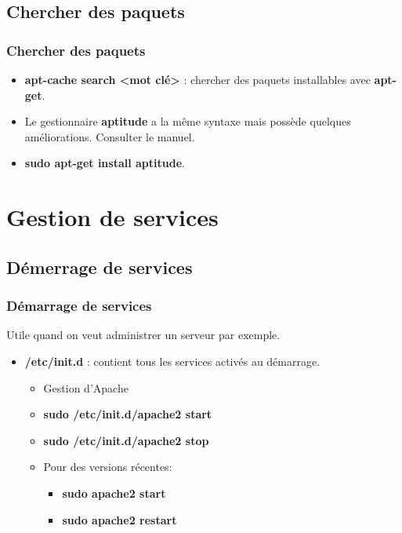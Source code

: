 \documentclass{beamer}
\begin{document}
    \subsection{Chercher des paquets}
    \begin{frame}
        \frametitle{Chercher des paquets}
        \begin{itemize}
            \item {\bf apt-cache search <mot clé>} : chercher des paquets installables avec {\bf apt-get}.
            \item Le gestionnaire {\bf aptitude} a la même syntaxe mais possède quelques améliorations. Consulter le manuel.
            \item {\bf sudo apt-get install aptitude}.
        \end{itemize}
    \end{frame}
    
    \section{Gestion de services}
    \subsection{Démerrage de services}
    \begin{frame}
        \frametitle{Démarrage de services}
        Utile quand on veut administrer un serveur par exemple.
        \begin{itemize}
            \item {\bf /etc/init.d} : contient tous les services activés au démarrage.
                \begin{itemize}
                    \item Gestion d'Apache
                    \item {\bf sudo /etc/init.d/apache2 start}
                    \item {\bf sudo /etc/init.d/apache2 stop}
                    \item Pour des versions récentes:
                        \begin{itemize}
                            \item {\bf sudo apache2 start}
                            \item {\bf sudo apache2 restart}
                        \end{itemize}
                \end{itemize}
        \end{itemize}
    \end{frame}
\end{document}
